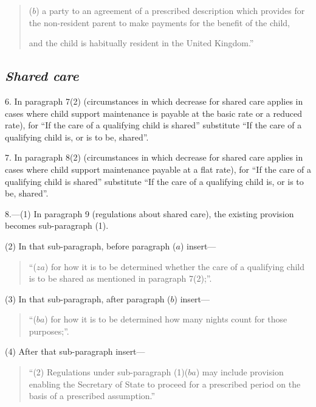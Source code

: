 \documentclass[12pt,a4paper]{article}
\begin{document}
{\begin{quotation}
\begin{enumerate}
($b$) a party to an agreement of a prescribed description which provides for the non-resident parent to make payments for the benefit of the child,
\end{enumerate}
and the child is habitually resident in the United Kingdom.”
\end{quotation}

\subsection*{\itshape Shared care}

6. In paragraph 7(2) (circumstances in which decrease for shared care applies in cases where child support maintenance is payable at the basic rate or a reduced rate), for “If the care of a qualifying child is shared” substitute “If the care of a qualifying child is, or is to be, shared”.

\medskip

7. In paragraph 8(2) (circumstances in which decrease for shared care applies in cases where child support maintenance payable at a flat rate), for “If the care of a qualifying child is shared” substitute “If the care of a qualifying child is, or is to be, shared”.

\medskip

8.---(1) In paragraph 9 (regulations about shared care), the existing provision becomes sub-paragraph (1).

(2) In that sub-paragraph, before paragraph ($a$) insert—
\begin{quotation}
“($za$) for how it is to be determined whether the care of a qualifying child is to be shared as mentioned in paragraph 7(2);”.
\end{quotation}

(3) In that sub-paragraph, after paragraph ($b$) insert—
\begin{quotation}
“($ba$) for how it is to be determined how many nights count for those purposes;”.
\end{quotation}

(4) After that sub-paragraph insert—
\begin{quotation}
“(2) Regulations under sub-paragraph (1)($ba$) may include provision enabling the 
Secretary of State
to proceed for a prescribed period on the basis of a prescribed assumption.”
\end{quotation}

}
\end{document}
